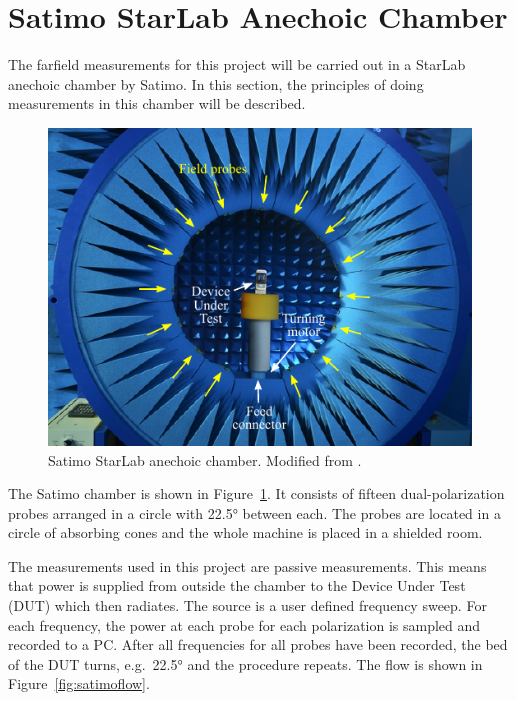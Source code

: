 \section{Satimo StarLab Anechoic Chamber}
The farfield measurements for this project will be carried out in a StarLab anechoic chamber by Satimo. In this section, the principles of doing measurements in this chamber will be described.

\begin{figure}[htbp]
    \centering
    \includegraphics{img/analysis/satimo}
    \caption{Satimo StarLab anechoic chamber. Modified from \cite{satimo}.}
    \label{fig:starlabchamber}
\end{figure}

The Satimo chamber is shown in Figure~\ref{fig:starlabchamber}. It consists of fifteen dual-polarization probes arranged in a circle with \ang{22.5} between each. The probes are located in a circle of absorbing cones and the whole machine is placed in a shielded room.

The measurements used in this project are passive measurements. This means that power is supplied from outside the chamber to the Device Under Test (DUT) which then radiates. The source is a user defined frequency sweep. For each frequency, the power at each probe for each polarization is sampled and recorded to a PC. After all frequencies for all probes have been recorded, the bed of the DUT turns, e.g.\ \ang{22.5} and the procedure repeats. The flow is shown in Figure~\ref{fig:satimoflow}.

